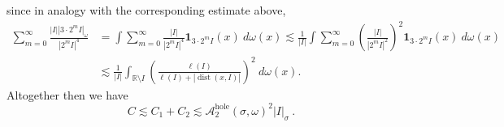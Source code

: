 \documentclass{amsart}%
\theoremstyle{plain}
\numberwithin{equation}{section}
\begin{document}
since in analogy with the corresponding estimate above,%
\begin{align*}
\sum_{m=0}^{\infty}\frac{\left\vert I\right\vert \left\vert 3\cdot
2^{m}I\right\vert _{\omega}}{\left\vert 2^{m}I\right\vert ^{4}}  & =\int
\sum_{m=0}^{\infty}\frac{\left\vert I\right\vert }{\left\vert 2^{m}%
I\right\vert ^{4}}\mathbf{1}_{3\cdot2^{m}I}\left(  x\right)  \ d\omega\left(
x\right)  \lesssim\frac{1}{\left\vert I\right\vert }\int\sum_{m=0}^{\infty
}\left(  \frac{\left\vert I\right\vert }{\left\vert 2^{m}I\right\vert ^{2}%
}\right)  ^{2}\mathbf{1}_{3\cdot2^{m}I}\left(  x\right)  \ d\omega\left(
x\right)  \\
& \lesssim\frac{1}{\left\vert I\right\vert }\int_{\mathbb{R}\setminus
I}\left(  \frac{\ell\left(  I\right)  }{\ell\left(  I\right)  +\left\vert
\operatorname*{dist}\left(  x,I\right)  \right\vert }\right)  ^{2}%
\ d\omega\left(  x\right)  .
\end{align*}
Altogether then we have%
\[
C\lesssim C_{1}+C_{2}\lesssim\mathcal{A}_{2}^{\operatorname*{hole}}\left(
\sigma,\omega\right)  ^{2}\left\vert I\right\vert _{\sigma}\ .
\]
\end{document}
